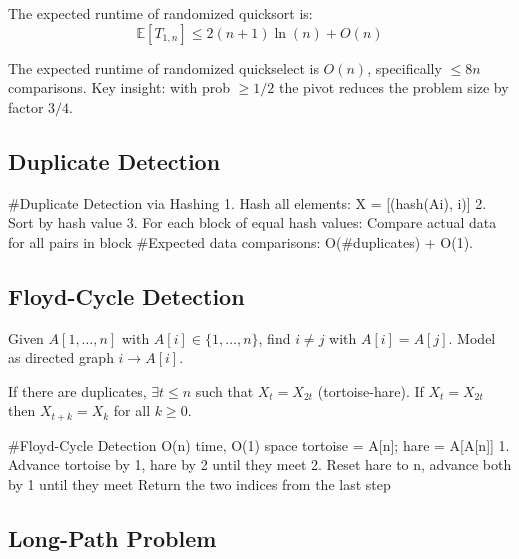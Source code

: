 \begin{theorem}
	The expected runtime of randomized quicksort is:
	$$\mathbb{E}[T_{1,n}] \leq 2(n+1)\ln(n) + O(n)$$
\end{theorem}

\begin{theorem}
	The expected runtime of randomized quickselect is $O(n)$, specifically $\leq 8n$ comparisons. Key insight: with prob $\geq 1/2$ the pivot reduces the problem size by factor $3/4$.
\end{theorem}

\subsection{Duplicate Detection}

\begin{algorithm}
	#Duplicate Detection via Hashing
	1. Hash all elements: X = [(hash(Ai), i)]
	2. Sort by hash value
	3. For each block of equal hash values:
	Compare actual data for all pairs in block
	#Expected data comparisons: O(#duplicates) + O(1).
\end{algorithm}

\subsection{Floyd-Cycle Detection}

\begin{definition}
	Given $A[1,\dots,n]$ with $A[i] \in \{1,\dots,n\}$, find $i \neq j$ with $A[i] = A[j]$. Model as directed graph $i \to A[i]$.
\end{definition}

\begin{lemma}
	If there are duplicates, $\exists t \leq n$ such that $X_t = X_{2t}$ (tortoise-hare). If $X_t = X_{2t}$ then $X_{t+k} = X_k$ for all $k \geq 0$.
\end{lemma}

\begin{algorithm}
	#Floyd-Cycle Detection O(n) time, O(1) space
	tortoise = A[n]; hare = A[A[n]]
	1. Advance tortoise by 1, hare by 2 until they meet
	2. Reset hare to n, advance both by 1 until they meet
	Return the two indices from the last step
\end{algorithm}

\subsection{Long-Path Problem}

